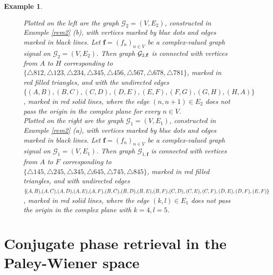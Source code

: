 \documentclass[12pt,oneside,reqno]{amsart}
\newtheorem{example}[theorem]{Example}%
\numberwithin{equation}{section}
\begin{document}
\begin{example}
{\begin{figure}[t]
				
				\caption{
					Plotted on the left are the graph $\mathcal{G}_2=(V, E_2)$, constructed in Example \ref{rem2} (b),   with vertices marked by blue dots and edges marked in black lines. Let $\mathbf{f}=(f_n)_{n\in V}$ be a complex-valued graph signal on $\mathcal{G}_2=(V, E_2)$. Then graph $\mathcal{G}_{2, {\bf f}}$ is connected  with  vertices from $A$ to $H$ corresponding to $\{\triangle 812, \triangle 123, \triangle 234, \triangle 345, \triangle 456, \triangle 567, \triangle 678, \triangle 781\}$, marked in red  filled triangles, and with  the undirected edges $\{(A, B), (B,C), (C, D), (D,E), (E, F), (F, G), (G, H), (H, A) \}$, marked in red solid lines, where the edge $(n,n+1)\in E_2$ does not pass the origin  in the complex plane for every $n\in V$. \\
					Plotted on the right are the graph $\mathcal{G}_1=(V, E_1)$, constructed in Example \ref{rem2} (a),  with vertices marked by blue dots and edges marked in black lines. Let $\mathbf{f}=(f_n)_{n\in V}$ be a complex-valued graph signal on $\mathcal{G}_1=(V, E_1)$. Then graph $\mathcal{G}_{1,\mathbf{f}}$ is connected with vertices from $A$ to $F$ corresponding to  $\{\triangle 145, \triangle 245, \triangle 345, \triangle 645, \triangle 745, \triangle 845\}$, marked in red filled triangles, and with undirected edges $\{\hskip-.02in (A,B),\hskip-.02in (A,C), \hskip-.02in (A,D), \hskip-.02in (A,E), \hskip-.02in (A,F), \hskip-.02in (B,C), \hskip-.02in (B,D), \hskip-.02in (B,E), \hskip-.02in (B,F), \hskip-.02in (C,D),\allowbreak (C,E),(C,F),(D,E),(D,F),(E,F)\}$, marked in red solid lines, where  the edge $(k,l)\in E_1$ does not pass the origin in the complex plane with $k=4, l=5$.
				} \label{fig1}
			\end{figure}
			
			
			
			
		}
		
	\end{example}
	
	
		
	\section{Conjugate phase retrieval in the Paley-Wiener space}\label{cpr.pw.sec}
	
\end{document}
